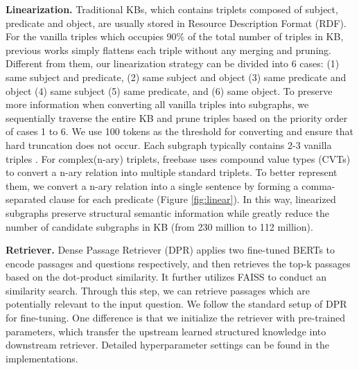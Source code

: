 \documentclass[sigconf,natbib=true,anonymous=False]{acmart}
\begin{document}
\textbf{Linearization.} Traditional KBs, which contains triplets composed of subject, predicate and object, are usually stored in Resource Description Format (RDF). For the vanilla triples which occupies 90\% of the total number of triples in KB, previous works \cite{das2022knowledge,yan2021large,yu2022decaf} simply flattens each triple without any merging and pruning. Different from them, our linearization strategy can be divided into 6 cases: (1) same subject and predicate, (2) same subject and object (3) same predicate and object (4) same subject (5) same predicate, and (6) same object. To preserve more information when converting all vanilla triples into subgraphs, we sequentially traverse the entire KB and prune triples based on the priority order of cases 1 to 6. We use 100 tokens as the threshold for converting and ensure that hard truncation does not occur. Each subgraph typically contains 2-3 vanilla triples . For complex(n-ary) triplets, freebase uses compound value types (CVTs) to convert a n-ary relation into multiple standard triplets. To better represent them, we convert a n-ary relation into a single sentence by forming a comma-separated clause for each predicate (Figure \ref{fig:linear}). In this way, linearized subgraphs preserve structural semantic information while greatly reduce the number of candidate subgraphs in KB (from 230 million to 112 million).






\textbf{Retriever.} Dense Passage Retriever (DPR) applies two fine-tuned BERTs \cite{devlin2018bert} to encode passages and questions respectively, and then retrieves the top-k passages based on the dot-product similarity. It further utilizes FAISS \cite{johnson2019billion} to conduct an similarity search. Through this step, we can retrieve  passages which are potentially relevant to the input question. We follow the standard setup of DPR for fine-tuning. One difference is that we initialize the retriever with pre-trained parameters, which transfer the upstream learned structured knowledge into downstream retriever. Detailed hyperparameter settings can be found in the implementations.
\end{document}
